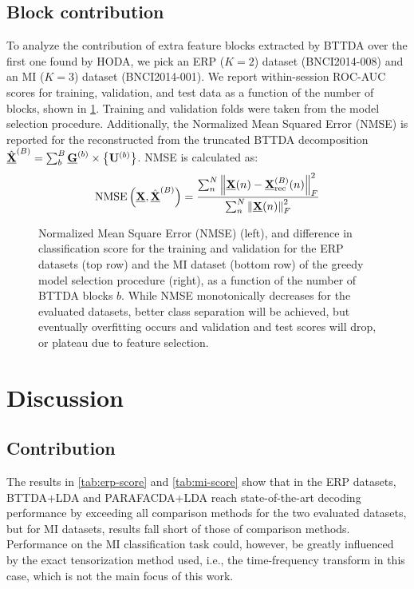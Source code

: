 \subsection{Block contribution}
To analyze the contribution of extra feature blocks extracted by BTTDA over
the first one found by HODA, we pick an ERP ($K=2$) dataset
(BNCI2014-008) and an MI ($K=3$) dataset (BNCI2014-001).
We report within-session ROC-AUC scores for training, validation, and test data as a function
of the number of blocks, shown in \cref{fig:blocks}.
Training and validation folds were taken from the model selection procedure.
Additionally, the Normalized Mean Squared Error (NMSE) is reported for the
reconstructed from the truncated BTTDA decomposition
$\textstyle{\hat{\underline{\mathbf{X}}}^{(B)}=\sum_b^B\underline{\mathbf{G}}^{(b)}\times\left\{\mathbf{U}^{(b)}\right\}}$.
NMSE is calculated as:
\begin{equation}
  \operatorname{NMSE}\left(\underline{\mathbf{X}}, \hat{\underline{\mathbf{X}}}^{(B)}\right) =
	\frac{\sum_n^N\left\lVert\underline{\mathbf{X}}(n)-\underline{\mathbf{X}}_\text{rec}^{(B)}(n)\right\rVert_F^2}
	{\sum_n^N\left\lVert\underline{\mathbf{X}}(n)\right\rVert_F^2}
\end{equation}
\begin{figure}[t]
  \centering
  \makebox[\linewidth][c]{
	  
  }
  \caption[Analysis of NMSE and classification score per block.]{%
    Normalized Mean Square Error (NMSE) (left), and difference in
    classification score for the training and validation for the ERP datasets
    (top row) and the MI dataset (bottom row)	of the greedy model selection
    procedure (right), as a function of the number of BTTDA blocks $b$.
		While NMSE monotonically decreases for the evaluated datasets, better class
		separation will be achieved, but eventually overfitting occurs and validation
		and test scores will drop, or plateau due to feature selection.
	}
	\label{fig:blocks}
\end{figure}

\section{Discussion}
\subsection{Contribution}
The results in \cref{tab:erp-score} and \autoref{tab:mi-score} show that
in the ERP datasets, BTTDA+LDA and PARAFACDA+LDA reach state-of-the-art decoding performance by
exceeding all comparison methods for the two evaluated datasets, but
for MI datasets, results fall short of those of comparison methods.
Performance on the MI classification task could, however, be greatly influenced
by the exact tensorization method used, i.e., the time-frequency transform in
this case, which is not the main focus of this work.

